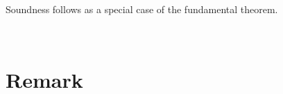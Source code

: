 \documentclass[authoryear, acmsmall, screen, review, nonacm]{acmart}
\begin{document}
\begin{code}%
\>[0]\AgdaSpace{}%
\AgdaSymbol{:}\AgdaSpace{}%
\AgdaSpace{}%
\AgdaSymbol{(}\AgdaSpace{}%
\AgdaSymbol{:}\AgdaSpace{}%
\AgdaSpace{}%
\AgdaSpace{}%
\AgdaSymbol{)}\AgdaSpace{}%
\AgdaSpace{}%
\AgdaSpace{}%
\AgdaSpace{}%
\AgdaSpace{}%
\AgdaSpace{}%
\<%
\end{code}

Soundness follows as a special case of the fundamental theorem.

\begin{code}%
\>[0]\AgdaSpace{}%
\AgdaSymbol{:}\AgdaSpace{}%
\AgdaSpace{}%
\AgdaSymbol{\{}\AgdaSpace{}%
\AgdaSymbol{\}}\AgdaSpace{}%
\AgdaSpace{}%
\AgdaSymbol{(}\AgdaSpace{}%
\AgdaSymbol{:}\AgdaSpace{}%
\AgdaSpace{}%
\AgdaSpace{}%
\AgdaSymbol{)}\AgdaSpace{}%
\AgdaSpace{}%
\AgdaSpace{}%
\AgdaSpace{}%
\AgdaSpace{}%
\AgdaSymbol{(}\AgdaSpace{}%
\AgdaSymbol{)}\<%
\\
\>[0]\AgdaSpace{}%
\AgdaSpace{}%
\AgdaSymbol{=}\AgdaSpace{}%
\AgdaSpace{}%
\AgdaSymbol{(}\AgdaSpace{}%
\AgdaSpace{}%
\AgdaSymbol{(}\AgdaSpace{}%
\AgdaSymbol{))}\AgdaSpace{}%
\AgdaSymbol{(}\AgdaSpace{}%
\AgdaSymbol{)}\AgdaSpace{}%
\AgdaSymbol{((}\AgdaSpace{}%
\AgdaSymbol{(}\AgdaSpace{}%
\AgdaSpace{}%
\AgdaSymbol{)))}\<%
\end{code}
\begin{code}[hide]%
\>[0]\AgdaSpace{}%
\AgdaSymbol{=}\AgdaSpace{}%
\AgdaSpace{}%
\AgdaSymbol{\AgdaUnderscore{}}\<%
\end{code}


\section{Remark}
\end{document}
